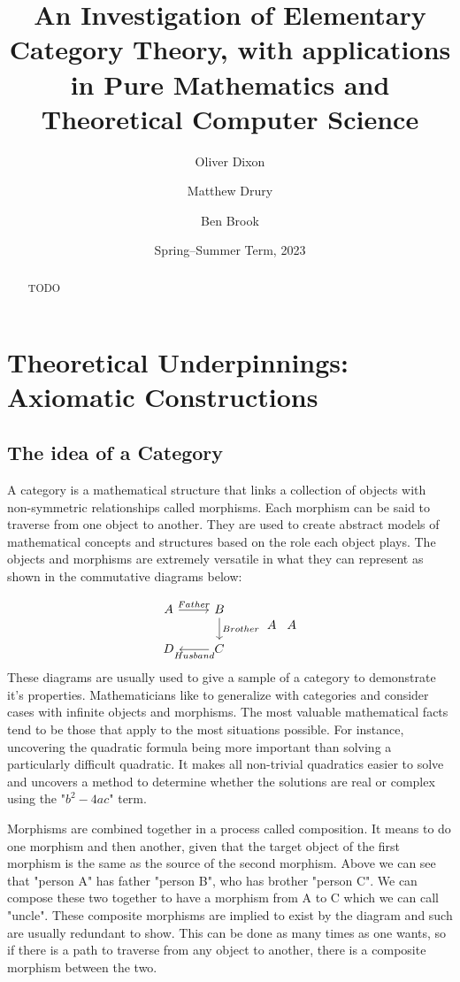 \documentclass[10pt,a4paper]{amsart}
\title[An Investigation of Elementary Category Theory]{An Investigation of %
        Elementary Category Theory, with applications in Pure Mathematics and %
        Theoretical Computer Science}
\author{Oliver Dixon}  \email{\yorkemail{od641}}
\author{Matthew Drury} \email{\yorkemail{md1499}}
\author{Ben Brook}     \email{\yorkemail{bb1170}}
\date{Spring--Summer Term, 2023}
\begin{document}
\begin{abstract}
        TODO
\end{abstract}
\maketitle
\tableofcontents
\section{Theoretical %
        Underpinnings: Axiomatic Constructions}
\subsection{The idea of a Category}
A category is a mathematical structure that links a collection of objects with non-symmetric relationships called morphisms.
Each morphism can be said to traverse from one object to another.
They are used to create abstract models of mathematical concepts and structures based on the role each object plays.
The objects and morphisms are extremely versatile in what they can represent as shown in the commutative diagrams below:

\begin{equation}
\begin{tikzcd} 
        A \ar[r,"Father"] & B \ar[d,"Brother"]\\
        D & C \ar[l,"Husband"]
\end{tikzcd}
%
\begin{tikzcd}
A
\end{tikzcd}
%
\begin{tikzcd}
A
\end{tikzcd}
\end{equation}
These diagrams are usually used to give a sample of a category to demonstrate it's properties.
Mathematicians like to generalize with categories and consider cases with infinite objects and morphisms.
The most valuable mathematical facts tend to be those that apply to the most situations possible.
For instance, uncovering the quadratic formula being more important than solving a particularly difficult quadratic.
It makes all non-trivial quadratics easier to solve and uncovers a method to determine whether the solutions are real or complex using the "$b^2-4ac$" term.

Morphisms are combined together in a process called composition.
It means to do one morphism and then another, given that the target object of the first morphism is the same as the source of the second morphism.
Above we can see that "person A" has father "person B", who has brother "person C".
We can compose these two together to have a morphism from A to C which we can call "uncle".
These composite morphisms are implied to exist by the diagram and such are usually redundant to show.
This can be done as many times as one wants, so if there is a path to traverse from any object to another, there is a composite morphism between the two.
\end{document}
